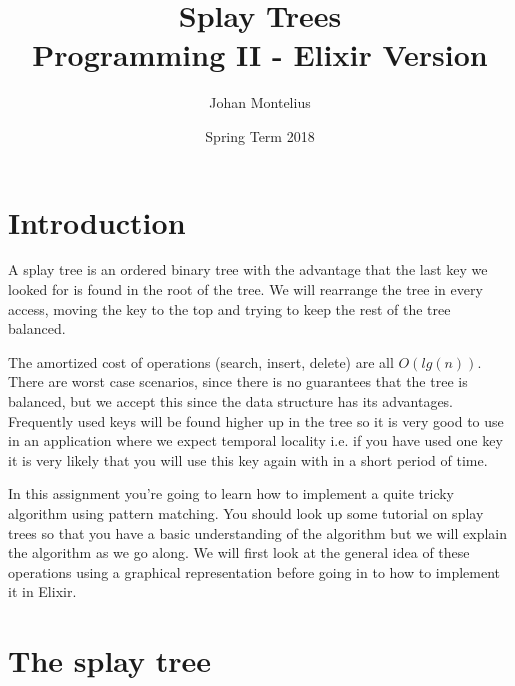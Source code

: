\documentclass[a4paper,11pt]{article}
\begin{document}

\title{
    \textbf{Splay Trees}\\
    \large{Programming II - Elixir Version}
}
\author{Johan Montelius}
\date{Spring Term 2018}
\maketitle
{}



\section*{Introduction}

A splay tree is an ordered binary tree with the advantage that the
last key we looked for is found in the root of the tree. We will 
rearrange the tree in every access, moving the key to the top and
trying to keep the rest of the tree balanced.

The amortized cost of operations (search, insert, delete) are all
$O(lg(n))$. There are worst case scenarios, since there is no
guarantees that the tree is balanced, but we accept this since the data
structure has its advantages. Frequently used keys will be found
higher up in the tree so it is very good to use in an application
where we expect temporal locality i.e. if you have used one key it is
very likely that you will use this key again with in a short period of time.

In this assignment you're going to learn how to implement a quite
tricky algorithm using pattern matching. You should look up some
tutorial on splay trees so that you have a basic understanding of the
algorithm but we will explain the algorithm as we go along. We will
first look at the general idea of these operations using a graphical
representation before going in to how to implement it in Elixir. 



\section{The splay tree}
\end{document}
